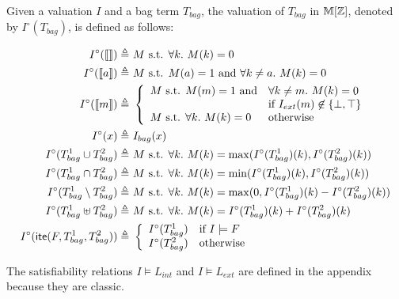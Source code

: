 Given a valuation $I$ and a bag term $T_{bag}$, the valuation of $T_{bag}$ in $\mathbb{M}[\mathbb{Z}]$,
denoted by $I^\circ(T_{bag})$, is defined as follows:
\begin{small}
\begin{align*}
I^\circ(\llbracket  \rrbracket) \triangleq&\ M \mbox{ s.t. }\forall k.~M(k)=0
\\
I^\circ(\llbracket a \rrbracket) \triangleq&\ M \mbox{ s.t. }M(a)=1 \mbox{ and } \forall k\neq a.~M(k)=0
\\
I^\circ(\llbracket m \rrbracket) \triangleq&\
\left\{\begin{array}{ll}
M \mbox{ s.t. } M(m)=1 \mbox{ and} & \forall k\neq m.~M(k)=0 \\
  & \mbox{if } I_{ext}(m) \not\in\{\bot,\top\} \\
M \mbox{ s.t. } \forall k.~M(k)=0 & \mbox{otherwise}
\end{array}\right.
\\
I^\circ(x) \triangleq&\ I_{bag}(x)
\\
I^\circ(T^1_{bag} \cup T^2_{bag}) \triangleq&\ M\mbox{ s.t. }\forall k.~M(k)=\max(I^\circ(T^1_{bag})(k), I^\circ(T^2_{bag})(k))
\\
I^\circ(T^1_{bag} \cap T^2_{bag}) \triangleq&\ M\mbox{ s.t. }\forall k.~M(k)=\min(I^\circ(T^1_{bag})(k), I^\circ(T^2_{bag})(k))
\\
I^\circ(T^1_{bag} \setminus T^2_{bag}) \triangleq&\ M\mbox{ s.t. }\forall k.~M(k)=\max(0, I^\circ(T^1_{bag})(k) - I^\circ(T^2_{bag})(k))
\\
I^\circ(T^1_{bag} \uplus T^2_{bag}) \triangleq&\ M\mbox{ s.t. }\forall k.~M(k)=I^\circ(T^1_{bag})(k) + I^\circ(T^2_{bag})(k)
\\
I^\circ(\textsf{ite}(F,T^1_{bag},T^2_{bag})) \triangleq&\
\left\{\begin{array}{ll}
I^\circ(T^1_{bag}) & \mbox{if } I \models F \\
I^\circ(T^2_{bag}) & \mbox{otherwise}
\end{array}\right.
\end{align*}
\end{small}

The satisfiability relations $I \models L_{int}$  and $I \models L_{ext}$
are defined in the appendix because they are classic.


